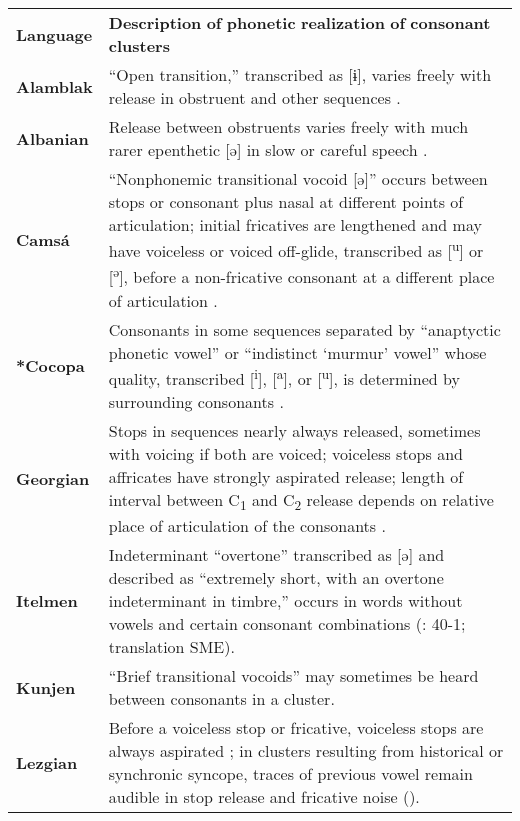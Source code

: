 \begin{table}
\begin{tabularx}{\textwidth}{XX}
\lsptoprule

\textbf{Language} & \textbf{Description} \textbf{of} \textbf{phonetic} \textbf{realization} \textbf{of} \textbf{consonant} \textbf{clusters}\\
\textbf{Alamblak} & “Open transition,” transcribed as [ɨ], varies freely with release in obstruent and other sequences \citep[56-9]{Bruce1984}.\\
\textbf{Albanian} & Release between obstruents varies freely with much rarer epenthetic [ə] in slow or careful speech \citep[24-6]{Klippenstein2010}.\\
{\bfseries Camsá} & “Nonphonemic transitional vocoid [ə]” occurs between stops or consonant plus nasal at different points of articulation; initial fricatives are lengthened and may have voiceless or voiced off-glide, transcribed as [\textsuperscript{u}] or [\textsuperscript{ə}], before a non-fricative consonant at a different place of articulation \citep[81]{Howard1967}.\\
\textbf{*Cocopa} & Consonants in some sequences separated by “anaptyctic phonetic vowel” or “indistinct ‘murmur’ vowel” whose quality, transcribed [\textsuperscript{i}], [\textsuperscript{a}], or [\textsuperscript{u}], is determined by surrounding consonants \citep[37-45]{Crawford1966}.\\
\textbf{Georgian} & Stops in sequences nearly always released, sometimes with voicing if both are voiced; voiceless stops and affricates have strongly aspirated release; length of interval between C\textsubscript{1} and C\textsubscript{2} release depends on relative place of articulation of the consonants \citep{Chitoran1999}.\\
\textbf{Itelmen} & Indeterminant “overtone” transcribed as [ə] and described as “extremely short, with an overtone indeterminant in timbre,” occurs in words without vowels and certain consonant combinations (\citealt{Volodin1976}: 40-1; translation SME).\\
\textbf{Kunjen} & “Brief transitional vocoids” may sometimes be heard between consonants in a cluster. \citep[33]{Sommer1969}\\
\textbf{Lezgian} & Before a voiceless stop or fricative, voiceless stops are always aspirated \citep[47]{Haspelmath1993}; in clusters resulting from historical or synchronic syncope, traces of previous vowel remain audible in stop release and fricative noise (\citealt{ChitoranBabaliyeva2007}).\\

\end{tabularx}
\end{table}
